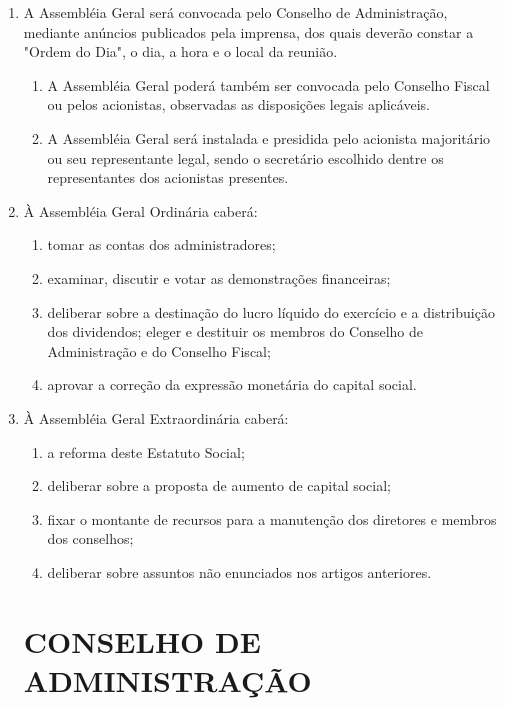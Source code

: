 \documentclass[a4paper,11pt]{report}
\begin{document}
\begin{enumerate}[resume, label=Art. \arabic*]
\item A Assembléia Geral será convocada pelo Conselho de Administração, mediante anúncios publicados pela imprensa, dos quais deverão constar a "Ordem do Dia", o dia, a hora e o local da reunião.

\begin{enumerate}[label= \S \arabic*]
    \item A Assembléia Geral poderá também ser convocada pelo Conselho Fiscal ou pelos acionistas, observadas as disposições legais aplicáveis.
    \item A Assembléia Geral será instalada e presidida pelo acionista majoritário ou seu representante legal, sendo o secretário escolhido dentre os representantes dos acionistas presentes.
\end{enumerate}

\item À Assembléia Geral Ordinária caberá:

\begin{enumerate}[label=\roman*.]
    \item tomar as contas dos administradores;
    \item examinar, discutir e votar as demonstrações financeiras;
    \item deliberar sobre a destinação do lucro líquido do exercício e a distribuição dos dividendos;
    eleger e destituir os membros do Conselho de Administração e do Conselho Fiscal;
    \item aprovar a correção da expressão monetária do capital social.
\end{enumerate}

\item À Assembléia Geral Extraordinária caberá:

\begin{enumerate}[label=\roman*.]
    \item a reforma deste Estatuto Social;
    \item deliberar sobre a proposta de aumento de capital social;
    \item fixar o montante de recursos para a manutenção dos diretores e membros dos conselhos;
    \item deliberar sobre assuntos não enunciados nos artigos anteriores.
\end{enumerate}

\section{CONSELHO DE ADMINISTRAÇÃO}


\end{enumerate}
\end{document}
